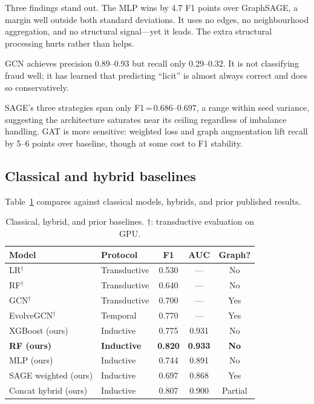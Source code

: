 \documentclass[11pt]{article}
\begin{document}
Three findings stand out.  The MLP wins by 4.7 F1 points over
GraphSAGE, a margin well outside both standard deviations.  It uses
no edges, no neighbourhood aggregation, and no structural signal---yet
it leads.  The extra structural processing hurts rather than helps.

GCN achieves precision 0.89--0.93 but recall only 0.29--0.32.  It is
not classifying fraud well; it has learned that predicting ``licit''
is almost always correct and does so conservatively.

SAGE's three strategies span only F1\,=\,0.686--0.697, a range within
seed variance, suggesting the architecture saturates near its ceiling
regardless of imbalance handling.  GAT is more sensitive: weighted
loss and graph augmentation lift recall by 5--6 points over baseline,
though at some cost to F1 stability.

\subsection{Classical and hybrid baselines}

Table~\ref{tab:classical} compares against classical models, hybrids,
and prior published results.

\begin{table}[t]
\centering
\small
\caption{Classical, hybrid, and prior baselines.
$\dagger$: transductive evaluation on GPU.}
\label{tab:classical}
\begin{tabular}{llccc}
\toprule
\textbf{Model} & \textbf{Protocol} & \textbf{F1} & \textbf{AUC}
  & \textbf{Graph?} \\
\midrule
LR$^\dagger$~\citep{weber2019} & Transductive & 0.530 & --- & No \\
RF$^\dagger$~\citep{weber2019} & Transductive & 0.640 & --- & No \\
GCN$^\dagger$~\citep{weber2019} & Transductive & 0.700 & --- & Yes \\
EvolveGCN$^\dagger$~\citep{pareja2020evolvegcn} & Temporal & 0.770
  & --- & Yes \\
\midrule
XGBoost (ours) & Inductive & 0.775 & 0.931 & No \\
\textbf{RF (ours)} & \textbf{Inductive} & \textbf{0.820}
  & \textbf{0.933} & \textbf{No} \\
MLP (ours) & Inductive & 0.744 & 0.891 & No \\
SAGE weighted (ours) & Inductive & 0.697 & 0.868 & Yes \\
Concat hybrid (ours) & Inductive & 0.807 & 0.900 & Partial \\
\bottomrule
\end{tabular}
\end{table}
\end{document}
